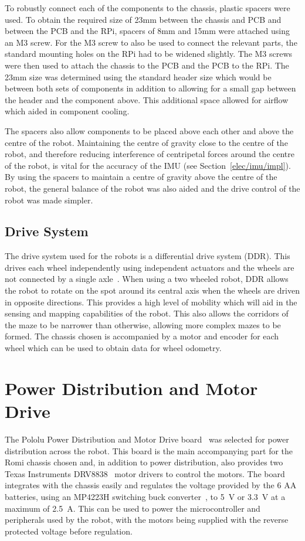 To robustly connect each of the components to the 
chassis, plastic spacers were used. To obtain the required size 
of 23mm between the chassis and PCB 
and between the PCB and the RPi, spacers of 8mm and 15mm 
were attached using an M3 screw. For the M3 screw to also 
be used to connect the relevant parts, the standard mounting holes 
on the RPi had to be widened slightly. The M3 screws were 
then used to attach the chassis to the PCB and the PCB to the 
RPi. The 23mm size was determined using the standard 
header size which would be between both sets of components in 
addition to allowing for a small gap between the header and the 
component above. This additional space allowed for airflow which 
aided in component cooling. 

The spacers also allow components to be placed above each other 
and above the centre of the robot. Maintaining the centre of 
gravity close to the centre of the robot, and therefore reducing 
interference of centripetal forces around the centre of the robot, 
is vital for the accuracy of the IMU (see Section~\ref{elec/imu/impl}). By using 
the spacers to maintain a centre of gravity above the centre of the 
robot, the general balance of the robot was also aided and the drive 
control of the robot was made simpler.  

\subsection{Drive System}\label{mech/chassis/drive}

The drive system used for the robots is a differential drive system (DDR).
This drives each wheel independently using independent actuators and the
wheels are not connected by a single axle~\cite[p.~146]{braunl_embedded_2013}.
When using a two wheeled robot, DDR allows the
robot to rotate on the spot around its central axis when the wheels 
are driven in opposite directions. This provides a high level of 
mobility which will aid in the sensing and mapping capabilities of 
the robot. This also allows the corridors of the maze to be narrower 
than otherwise, allowing more complex mazes to be formed. The 
chassis chosen is accompanied by a motor and encoder for each wheel 
which can be used to obtain data for wheel odometry. 
  

\section{Power Distribution and Motor Drive}\label{elec/poweranddrive}
The Pololu Power Distribution and Motor Drive board~\cite{pololupower}
was selected for power distribution across
the robot. This board is the main accompanying part for the Romi
chassis chosen and, in addition to power distribution, also provides
two Texas Instruments DRV8838~\cite{texasdrivers} motor drivers to control
the motors. The board integrates with the chassis easily
and regulates the voltage provided by the 6 AA batteries, using an
MP4223H switching buck converter~\cite{mpbuck}, to \SI{5}{\volt} or
\SI{3.3}{\volt} at a maximum of \SI{2.5}{\ampere}. This can be used
to power the microcontroller and peripherals used by the robot, with the
motors being supplied with the reverse protected voltage before regulation.

